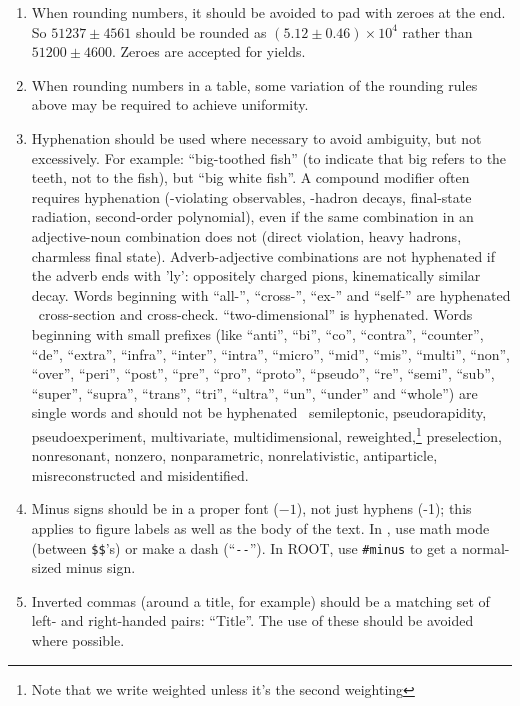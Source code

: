 \begin{enumerate}
\item When rounding numbers, it should be avoided to pad with zeroes
  at the end. So $51237 \pm 4561$ should be rounded as $(5.12 \pm 0.46)
  \times 10^4$ rather than $51200 \pm 4600$. Zeroes are accepted for yields.

\item When rounding numbers in a table, some variation of the rounding
  rules above may be required to achieve uniformity.

\item Hyphenation should be used where necessary to avoid ambiguity,
  but not excessively. For example: ``big-toothed fish'' (to indicate
  that big refers to the teeth, not to the fish), but ``big white
  fish''.  A compound modifier often requires hyphenation
  (\CP-violating observables, \bquark-hadron decays, final-state
  radiation, second-order polynomial), even if the same combination in
  an adjective-noun combination does not (direct \CP violation, heavy
  \bquark hadrons, charmless final state).  Adverb-adjective
  combinations are not hyphenated if the adverb ends with 'ly':
  oppositely charged pions, kinematically similar decay.  Words
  beginning with ``all-'', ``cross-'', ``ex-'' and ``self-'' are
  hyphenated \eg\ cross-section and cross-check. ``two-dimensional''
  is hyphenated. Words beginning with small prefixes (like ``anti'',
  ``bi'', ``co'', ``contra'', ``counter'', ``de'', ``extra'', ``infra'',
  ``inter'', ``intra'', ``micro'', ``mid'', ``mis'', ``multi'', ``non'', ``over'',
  ``peri'', ``post'', ``pre'', ``pro'', ``proto'', ``pseudo'', ``re'', ``semi'',
  ``sub'', ``super'', ``supra'', ``trans'', ``tri'', ``ultra'', ``un'', ``under'' and
  ``whole'') are single words and should not be hyphenated
  \eg\ semileptonic, pseudorapidity, pseudoexperiment, multivariate,
  multidimensional, reweighted,\footnote{Note that we write weighted unless it's the second weighting} preselection, nonresonant, nonzero,
  nonparametric, nonrelativistic, antiparticle,
  misreconstructed and misidentified.

\item Minus signs should be in a proper font ($-1$), not just hyphens
  (-1); this applies to figure labels as well as the body of the text.
  In \latex, use math mode (between \verb!$$!'s) or make a dash (``\verb!--!'').
  In ROOT, use \verb!#minus! to get a normal-sized minus sign. 

\item Inverted commas (around a title, for example) should be a
  matching set of left- and right-handed pairs: ``Title''. The use of
  these should be avoided where possible.


\end{enumerate}
